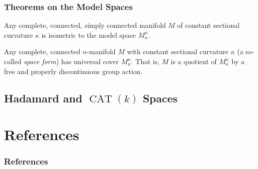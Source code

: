 \documentclass{beamer}
\DeclareMathOperator{\CAT}{CAT}
\theoremstyle{definition}
\begin{document}
\begin{frame}
    \frametitle{Theorems on the Model Spaces}

    \begin{theorem}
        Any complete, connected, simply connected manifold $M$ of constant sectional
        curvature $\kappa$ is isometric to the model space $M_\kappa^n$.
    \end{theorem}

    \begin{theorem}
        Any complete, connected $n$-manifold $M$ with constant sectional curvature $\kappa$
        (a so-called \emph{space form}) has universal cover $M_\kappa^n$.
        That is, $M$ is a quotient of $M_\kappa^n$ by a free and properly discontinuous
        group action.
    \end{theorem}
\end{frame}

\subsection{Hadamard and $\CAT(k)$ Spaces}

\begin{frame}
    \frametitle{}

    

\end{frame}

\section{References}

\begin{frame}
    \frametitle{References}

    \printbibliography

\end{frame}
\end{document}

